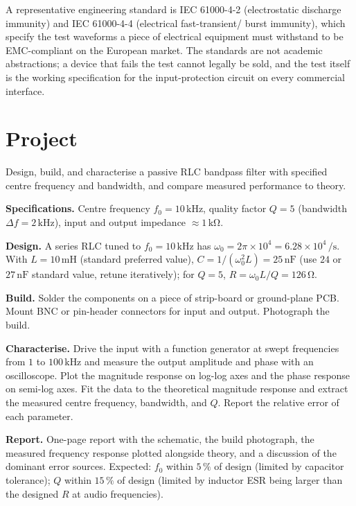 A representative engineering standard is IEC 61000-4-2 (electrostatic
discharge immunity) and IEC 61000-4-4 (electrical fast-transient/
burst immunity), which specify the test waveforms a piece of
electrical equipment must withstand to be EMC-compliant on the
European market. The standards are not academic abstractions; a
device that fails the test cannot legally be sold, and the test
itself is the working specification for the input-protection circuit
on every commercial interface.

\section{Project}

\begin{project}
Design, build, and characterise a passive RLC bandpass filter with
specified centre frequency and bandwidth, and compare measured
performance to theory.

\textbf{Specifications.} Centre frequency $f_{0} = 10\,\si{\kilo
\hertz}$, quality factor $Q = 5$ (bandwidth $\Delta f = 2\,\si{\kilo
\hertz}$), input and output impedance $\approx 1\,\si{\kilo\ohm}$.

\textbf{Design.} A series RLC tuned to $f_{0} = 10\,\si{\kilo\hertz}$
has $\omega_{0} = 2\pi\times 10^{4} = 6.28\times 10^{4}\,\si{\per
\second}$. With $L = 10\,\si{\milli\henry}$ (standard preferred
value), $C = 1/(\omega_{0}^{2}L) = 25\,\si{\nano\farad}$ (use $24$ or
$27\,\si{\nano\farad}$ standard value, retune iteratively); for
$Q = 5$, $R = \omega_{0}L/Q = 126\,\si{\ohm}$.

\textbf{Build.} Solder the components on a piece of strip-board or
ground-plane PCB. Mount BNC or pin-header connectors for input and
output. Photograph the build.

\textbf{Characterise.} Drive the input with a function generator at
swept frequencies from $1$ to $100\,\si{\kilo\hertz}$ and measure the
output amplitude and phase with an oscilloscope. Plot the magnitude
response on log-log axes and the phase response on semi-log axes. Fit
the data to the theoretical magnitude response and extract the
measured centre frequency, bandwidth, and $Q$. Report the relative
error of each parameter.

\textbf{Report.} One-page report with the schematic, the build
photograph, the measured frequency response plotted alongside theory,
and a discussion of the dominant error sources. Expected: $f_{0}$
within $5\,\%$ of design (limited by capacitor tolerance); $Q$ within
$15\,\%$ of design (limited by inductor ESR being larger than the
designed $R$ at audio frequencies).
\end{project}

